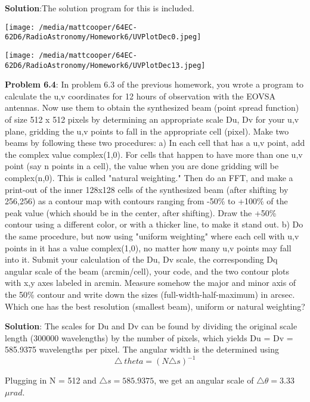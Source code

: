 \documentclass{article}
\begin{document}
\bigskip
\textbf{Solution}:The solution program for this is included.  

\smallskip
\texttt{[image: /media/mattcooper/64EC-62D6/RadioAstronomy/Homework6/UVPlotDec0.jpeg]}

\smallskip
\texttt{[image: /media/mattcooper/64EC-62D6/RadioAstronomy/Homework6/UVPlotDec13.jpeg]}

\textbf{Problem 6.4}:  In problem 6.3 of the previous homework, you wrote a program to calculate the u,v coordinates for 12 hours of observation with the EOVSA antennas. Now use them to obtain the synthesized beam (point spread function) of size 512 x 512 pixels by determining an appropriate scale Du, Dv for your u,v plane, gridding the u,v points to fall in the appropriate cell (pixel). Make two beams by following these two procedures: a) In each cell that has a u,v point, add the complex value complex(1,0). For cells that happen to have more than one u,v point (say n points in a cell), the value when you are done gridding will be complex(n,0). This is called "natural weighting." Then do an FFT, and make a print-out of the inner 128x128 cells of the synthesized beam (after shifting by 256,256) as a contour map with contours ranging from -50\% to +100\% of the peak value (which should be in the center, after shifting). Draw the +50\% contour using a different color, or with a thicker line, to make it stand out. b) Do the same procedure, but now using "uniform weighting" where each cell with u,v points in it has a value complex(1,0), no matter how many u,v points may fall into it. Submit your calculation of the Du, Dv scale, the corresponding Dq angular scale of the beam (arcmin/cell), your code, and the two contour plots with x,y axes labeled in arcmin. Measure somehow the major and minor axis of the 50\% contour and write down the sizes (full-width-half-maximum) in arcsec. Which one has the best resolution (smallest beam), uniform or natural weighting?

\bigskip
\textbf{Solution}:  The scales for Du and Dv can be found by dividing the original scale length (300000 wavelengths) by the number of pixels, which yields Du = Dv = 585.9375 wavelengths per pixel. The angular width is the determined using 
\begin{equation}
\triangle \ theta = (N\triangle s)^{-1}
\end{equation}

Plugging in N = 512 and $\triangle s = 585.9375$, we get an angular scale of $\triangle \theta = 3.33$ $\mu rad$.
\end{document}
